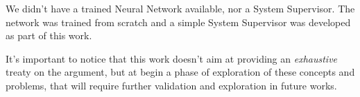 We didn't have a trained Neural Network available, nor a System Supervisor. The network was trained from scratch and a simple System Supervisor was developed as part of this work.

It's important to notice that this work doesn't aim at providing an \textsl{exhaustive} treaty on the argument, but at begin a phase of exploration of these concepts and problems, that will require further validation and exploration in future works.